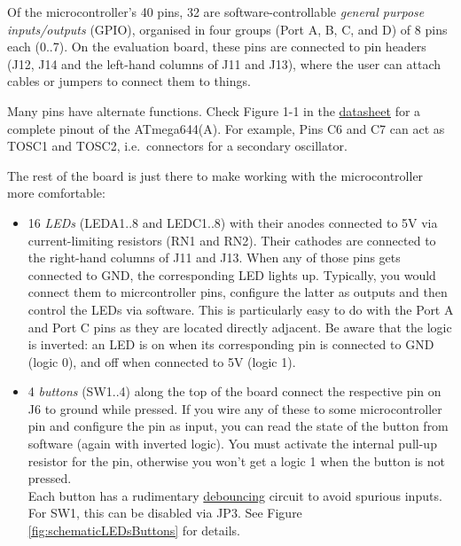 \documentclass{article}
\newcommand{\datasheet}{\href{https://ww1.microchip.com/downloads/en/DeviceDoc/doc2593.pdf}{datasheet}}
\begin{document}
Of the microcontroller's 40 pins, 32 are software-controllable \emph{general purpose inputs/outputs} (GPIO), organised in four groups (Port A, B, C, and D) of 8 pins each (0..7). On the evaluation board, these pins are connected to pin headers (J12, J14 and the left-hand columns of J11 and J13), where the user can attach cables or jumpers to connect them to things. 

Many pins have alternate functions. Check Figure 1-1 in the \datasheet{} for a complete pinout of the ATmega644(A). For example, Pins C6 and C7 can act as TOSC1 and TOSC2, i.e.\ connectors for a secondary oscillator. 

The rest of the board is just there to make working with the microcontroller more comfortable:

\begin{itemize}
\item 16 \emph{LEDs} (LEDA1..8 and LEDC1..8) with their anodes connected to 5V via current-limiting resistors (RN1 and RN2). Their cathodes are connected to the right-hand columns of J11 and J13. When any of those pins gets connected to GND, the corresponding LED lights up. Typically, you would connect them to micrcontroller pins, configure the latter as outputs and then control the LEDs via software. This is particularly easy to do with the Port A and Port C pins as they are located directly adjacent. Be aware that the logic is inverted: an LED is on when its corresponding pin is connected to GND (logic 0), and off when connected to 5V (logic 1). 
\item 4 \emph{buttons} (SW1..4) along the top of the board connect the respective pin on J6 to ground while pressed. If you wire any of these to some microcontroller pin and configure the pin as input, you can read the state of the button from software (again with inverted logic). You must activate the internal pull-up resistor for the pin, otherwise you won't get a logic 1 when the button is not pressed. \\
Each button has a rudimentary \href{https://en.wikipedia.org/wiki/Switch\#Contact\_bounce}{debouncing} circuit to avoid spurious inputs. For SW1, this can be disabled via JP3. See Figure \ref{fig:schematicLEDsButtons} for details. 
\begin{figure}[htb]
\centering

\end{figure}
\end{itemize}
\end{document}
